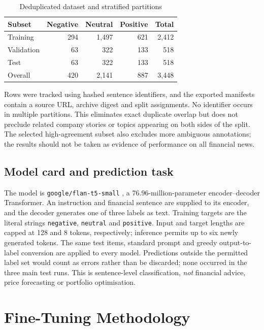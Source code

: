 \documentclass[conference,a4paper]{IEEEtran}
\begin{document}
\begin{table}[!t]
\centering
\caption{Deduplicated dataset and stratified partitions}
\label{tab:data}
\begin{tabular}{lrrrr}
\toprule
Subset & Negative & Neutral & Positive & Total\\
\midrule
Training & 294 & 1,497 & 621 & 2,412\\
Validation & 63 & 322 & 133 & 518\\
Test & 63 & 322 & 133 & 518\\
\midrule
Overall & 420 & 2,141 & 887 & 3,448\\
\bottomrule
\end{tabular}
\end{table}

Rows were tracked using hashed sentence identifiers, and the exported manifests contain a source URL, archive digest and split assignments. No identifier occurs in multiple partitions. This eliminates exact duplicate overlap but does not preclude related company stories or topics appearing on both sides of the split. The selected high-agreement subset also excludes more ambiguous annotations; the results should not be taken as evidence of performance on all financial news.

\subsection{Model card and prediction task}
The model is \texttt{google/flan-t5-small} \cite{flant5hub}, a 76.96-million-parameter encoder--decoder Transformer. An instruction and financial sentence are supplied to its encoder, and the decoder generates one of three labels as text. Training targets are the literal strings \texttt{negative}, \texttt{neutral} and \texttt{positive}. Input and target lengths are capped at 128 and 8 tokens, respectively; inference permits up to six newly generated tokens. The same test items, standard prompt and greedy output-to-label conversion are applied to every model. Predictions outside the permitted label set would count as errors rather than be discarded; none occurred in the three main test runs. This is sentence-level classification, \emph{not} financial advice, price forecasting or portfolio optimisation.

\section{Fine-Tuning Methodology}
\end{document}
